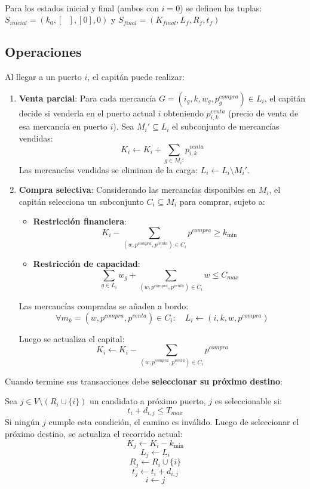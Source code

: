 \documentclass[12pt, a4paper]{article}
\begin{document}
\

Para los estados inicial y final (ambos con $i = 0$) se definen las tuplas: $S_{inicial} = (k_0, [\text{ }], [0], 0)$ y $S_{final} = (K_{final}, L_f, R_f, t_f)$   

\subsection{Operaciones}
Al llegar a un puerto $i$, el capitán puede realizar:

\begin{enumerate}
    \item \textbf{Venta parcial}: Para cada mercancía $G = (i_g, k, w_g, p_g^{compra}) \in L_i$, el capitán decide si venderla en el puerto actual $i$ obteniendo $p_{i,k}^{venta}$ (precio de venta de esa mercancía en puerto $i$). Sea $M_i' \subseteq L_i$ el subconjunto de mercancías vendidas:
    \[
    K_i \leftarrow K_i + \sum_{g \in M_i'} p_{i,k}^{venta}
    \]
    Las mercancías vendidas se eliminan de la carga: $L_i \leftarrow L_i \setminus M_i'$.
    
    \item \textbf{Compra selectiva}: Considerando las mercancías disponibles en $M_i$, el capitán selecciona un subconjunto $C_i \subseteq M_i$ para comprar, sujeto a:
    \begin{itemize}
        \item \textbf{Restricción financiera}: \[K_i - \sum_{(w,p^{compra},p^{venta}) \in C_i} p^{compra} \geq k_{\min}\]
        \item \textbf{Restricción de capacidad}: \[\sum_{g \in L_i} w_g + \sum_{(w,p^{compra},p^{venta}) \in C_i} w \leq C_{max}\]
    \end{itemize}
    Las mercancías compradas se añaden a bordo: \[ \forall m_k = (w,p^{compra},p^{venta}) \in C_i: \quad L_i \leftarrow (i, k, w, p^{compra})\] 
    
    Luego se actualiza el capital:
    \[
    K_i \leftarrow K_i - \sum_{(w,p^{compra},p^{venta}) \in C_i} p^{compra}
    \]
\end{enumerate}

Cuando termine sus transacciones debe \textbf{seleccionar su próximo destino}: 

Sea $j \in V \setminus (R_i \cup \{i\})$ un candidato a próximo puerto, $j$ es seleccionable si:
\[
t_i + d_{i,j} \leq T_{max}
\]
Si ningún $j$ cumple esta condición, el camino es inválido.
Luego de seleccionar el próximo destino, se actualiza el recorrido actual: 
\[K_j \leftarrow K_i - k_{\min}\]
\[L_j \leftarrow L_i\]
\[R_j \leftarrow R_i \cup \{i\}\] 
\[t_j \leftarrow t_i + d_{i,j}\]
\[i \leftarrow j\]
\end{document}
